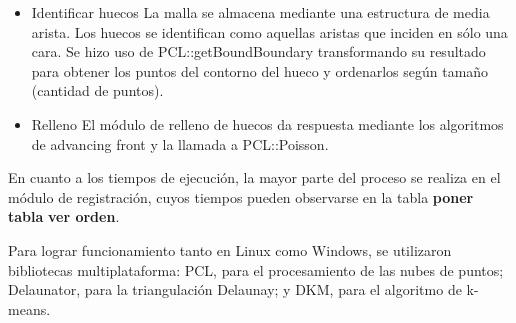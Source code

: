\documentclass{pfc}
\newcommand{\Alerta}[1]{{\Huge\bfseries\sffamily#1}}
\begin{document}
\begin{itemize}
			\item {Identificar huecos}
				La malla se almacena mediante una estructura de media arista. Los
				huecos se identifican como aquellas aristas que inciden en sólo una
				cara.
				Se hizo uso de PCL::getBoundBoundary transformando su resultado para
				obtener los puntos del contorno del hueco y ordenarlos según tamaño
				(cantidad de puntos).

			\item {Relleno}
				El módulo de relleno de huecos da respuesta mediante los algoritmos de advancing front y
				la llamada a PCL::Poisson.
		\end{itemize}


		En cuanto a  los tiempos de ejecución,
		la mayor parte del proceso se realiza en
		el módulo de registración, cuyos tiempos
		pueden observarse en la tabla \Alerta{poner tabla} \Alerta{ver orden}.

		Para lograr funcionamiento tanto en Linux como Windows,
		se utilizaron bibliotecas multiplataforma:
		PCL, para el procesamiento de las nubes de puntos;
		Delaunator, para la triangulación Delaunay;
		y DKM, para el algoritmo de k-means.


	
	
\end{document}
